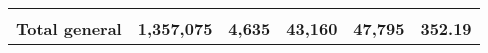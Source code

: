 \begin{tabular}{lrcclr}
	& \multicolumn{1}{l}{}                                           & \multicolumn{1}{l}{}                                       & \multicolumn{1}{l}{} &                                                                     & \multicolumn{1}{l}{}                                                         \\
	\rowcolor[HTML]{DDEBF7} 
	\textbf{Total   general}                                       & \textbf{1,357,075}                                             & \multicolumn{1}{r}{\cellcolor[HTML]{DDEBF7}\textbf{4,635}} & \textbf{43,160}      & \textbf{47,795}                                                     & \textbf{352.19}                                                             
\end{tabular}